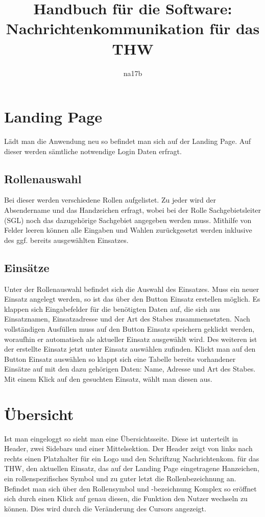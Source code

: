 \documentclass[a4paper,11pt,oneside, titlepage]{article}
\title{Handbuch für die Software: Nachrichtenkommunikation für das THW}
\author{na17b}
\date{}
\begin{document}
	\maketitle
	\tableofcontents
	
	\newpage
	
	\section{Landing Page}
	Lädt man die Anwendung neu so befindet man sich auf der Landing Page. Auf dieser werden sämtliche notwendige Login Daten erfragt.
	
	\subsection{Rollenauswahl}
	Bei dieser werden verschiedene Rollen aufgelistet. Zu jeder wird der Absendername und das Handzeichen erfragt, wobei bei der Rolle Sachgebietsleiter (SGL) noch das dazugehörige Sachgebiet angegeben werden muss.
	\newline
	Mithilfe von \glqq{}Felder leeren\grqq{} können alle Eingaben und Wahlen zurückgesetzt werden inklusive des ggf. bereits ausgewählten Einsatzes.
	
	\subsection{Einsätze}
	Unter der Rollenauswahl befindet sich die Auswahl des Einsatzes.
	Muss ein neuer Einsatz angelegt werden, so ist das über den Button \glqq{}Einsatz erstellen\grqq{} möglich. Es klappen sich Eingabefelder für die benötigten Daten auf, die sich aus Einsatznamen, Einsatzadresse und der Art des Stabes zusammensetzten. Nach vollständigen Ausfüllen muss auf den Button \glqq{} Einsatz speichern \grqq{} geklickt werden, woraufhin er automatisch als aktueller Einsatz ausgewählt wird. Des weiteren ist der erstellte Einsatz jetzt unter \glqq{} Einsatz auswählen \grqq zufinden.
	\newline
	\newline
	Klickt man auf den Button \glqq{}Einsatz auswählen\grqq{} so klappt sich eine Tabelle bereits vorhandener Einsätze auf mit den dazu gehörigen Daten: Name, Adresse und Art des Stabes. Mit einem Klick auf den gesuchten Einsatz, wählt man diesen aus.
	
	\section{Übersicht}
	Ist man eingeloggt so sieht man eine Übersichtsseite. Diese ist unterteilt in Header, zwei Sidebars und einer Mittelsektion.
	Der Header zeigt von links nach rechts einen Platzhalter für ein Logo und den Schriftzug \glqq{} Nachrichtenkom. für das THW\grqq{}, den aktuellen Einsatz, das auf der Landing Page eingetragene Hanzeichen, ein rollenspezifisches Symbol und zu guter letzt die Rollenbezeichnung an. 
	Befindet man sich über den Rollensymbol und -bezeichnung Komplex so eröffnet sich durch einen Klick auf genau diesen, die Funktion den Nutzer wechseln zu können. Dies wird durch die Veränderung des Cursors angezeigt.
		
\end{document}
